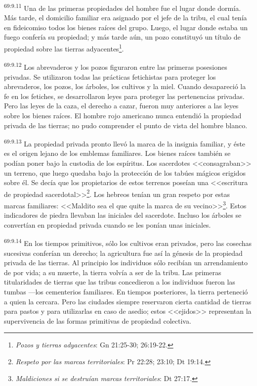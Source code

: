 \par
\textsuperscript{69:9.11} Una de las primeras propiedades del hombre fue el lugar donde dormía. Más tarde, el domicilio familiar era asignado por el jefe de la tribu, el cual tenía en fideicomiso todos los bienes raíces del grupo. Luego, el lugar donde estaba un fuego confería su propiedad; y más tarde aún, un pozo constituyó un título de propiedad sobre las tierras adyacentes\footnote{\textit{Pozos y tierras adyacentes}: Gn 21:25-30; 26:19-22.}.

\par
\textsuperscript{69:9.12} Los abrevaderos y los pozos figuraron entre las primeras posesiones privadas. Se utilizaron todas las prácticas fetichistas para proteger los abrevaderos, los pozos, los árboles, los cultivos y la miel. Cuando desapareció la fe en los fetiches, se desarrollaron leyes para proteger las pertenencias privadas. Pero las leyes de la caza, el derecho a cazar, fueron muy anteriores a las leyes sobre los bienes raíces. El hombre rojo americano nunca entendió la propiedad privada de las tierras; no pudo comprender el punto de vista del hombre blanco.

\par
\textsuperscript{69:9.13} La propiedad privada pronto llevó la marca de la insignia familiar, y éste es el origen lejano de los emblemas familiares. Los bienes raíces también se podían poner bajo la custodia de los espíritus. Los sacerdotes <<consagraban>> un terreno, que luego quedaba bajo la protección de los tabúes mágicos erigidos sobre él. Se decía que los propietarios de estos terrenos poseían una <<escritura de propiedad sacerdotal>>\footnote{\textit{Respeto por las marcas territoriales}: Pr 22:28; 23:10; Dt 19:14.}. Los hebreos tenían un gran respeto por estas marcas familiares: <<Maldito sea el que quite la marca de su vecino>>\footnote{\textit{Maldiciones si se destruían marcas territoriales}: Dt 27:17.}. Estos indicadores de piedra llevaban las iniciales del sacerdote. Incluso los árboles se convertían en propiedad privada cuando se les ponían unas iniciales.

\par
\textsuperscript{69:9.14} En los tiempos primitivos, sólo los cultivos eran privados, pero las cosechas sucesivas conferían un derecho; la agricultura fue así la génesis de la propiedad privada de las tierras. Al principio los individuos sólo recibían un arrendamiento de por vida; a su muerte, la tierra volvía a ser de la tribu. Las primeras titularidades de tierras que las tribus concedieron a los individuos fueron las tumbas ---los cementerios familiares. En tiempos posteriores, la tierra perteneció a quien la cercara. Pero las ciudades siempre reservaron cierta cantidad de tierras para pastos y para utilizarlas en caso de asedio; estos <<ejidos>> representan la supervivencia de las formas primitivas de propiedad colectiva.

